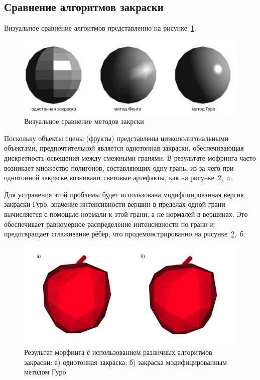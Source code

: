 \subsection{Сравнение алгоритмов закраски}

Визуальное сравнение алгоитмов представленно на рисунке~\ref{fig:shading_comparison}.

\begin{figure}[H]
    \centering
    \includegraphics[width=1\textwidth]{../inc/images/shading_2}
    \caption{Визуальное сравнение методов закрски}
    \label{fig:shading_comparison}
\end{figure}

Поскольку объекты сцены (фрукты) представлены низкополигональными объектами, предпочтительной является однотонная закраски, обеспечивающая дискретность освещения между смежными гранями. В результате мофринга часто возникает множество полигонов, составляющих одну грань, из-за чего при однотонной закраске возникают световые артефакты, как на рисунке~\ref{fig:gouraund_midified},~a.

Для устранения этой проблемы будет использована модифицированная версия закраски Гуро: значение интенсивности вершин в пределах одной грани вычисляется с помощью нормали к этой грани, а не нормалей в вершинах. Это обеспечивает равномерное распределение интенсивности по грани и предотвращает сглаживание рёбер, что продемонстрированно на рисунке~\ref{fig:gouraund_midified},~б.

\begin{figure}[H]
    \includegraphics[width=\linewidth]{../inc/images/gouraund_modified}
    \caption{Результат морфинга с использованием различных алгоритмов закраски: а) однотонная закраска; б) закраска модифицированным методом Гуро}
    \label{fig:gouraund_midified}
\end{figure}


